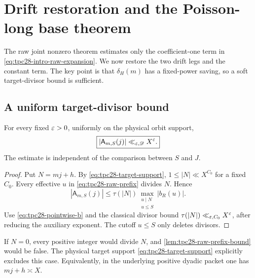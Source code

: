 \section{Drift restoration and the Poisson-long base theorem}
\label{sec:tpc28-drift-base}

The raw joint nonzero theorem estimates only the coefficient-one term
in \eqref{eq:tpc28-intro-raw-expansion}.  We now restore the two drift
legs and the constant term.  The key point is that $\delta_H(m)$ has
a fixed-power saving, so a soft target-divisor bound is sufficient.

\subsection{A uniform target-divisor bound}

\begin{lemma}
\label{lem:tpc28-raw-prefix-bound}
For every fixed $\varepsilon>0$, uniformly on the physical orbit support,
\begin{equation}
 \boxed{
 |\mathsf A_{m,S}(j)|\ll_{\varepsilon,\mathscr D}X^\varepsilon.}
 \label{eq:tpc28-raw-prefix-bound}
\end{equation}
The estimate is independent of the comparison between $S$ and $J$.
\end{lemma}

\begin{proof}
Put $N=mj+h$.  By \eqref{eq:tpc28-target-support},
$1\le|N|\ll X^{C_0}$ for a fixed $C_0$.  Every effective $u$ in
\eqref{eq:tpc28-raw-prefix} divides $N$.  Hence
\begin{equation}
 |\mathsf A_{m,S}(j)|
 \le\tau(|N|)
 \max_{\substack{u\mid N\\u\le S}}|b_R(u)|.
 \label{eq:tpc28-divisor-majorant}
\end{equation}
Use \eqref{eq:tpc28-pointwise-b} and the classical divisor bound
\(\tau(|N|)\ll_{\varepsilon,C_0}X^\varepsilon\), after reducing the auxiliary
exponent.  The cutoff $u\le S$ only deletes divisors.
\end{proof}

\begin{remark}
\label{rem:tpc28-nonzero-target}
If $N=0$, every positive integer would divide $N$, and
\cref{lem:tpc28-raw-prefix-bound} would be false.  The physical target
support \eqref{eq:tpc28-target-support} explicitly excludes this case.
Equivalently, in the underlying positive dyadic packet one has
$mj+h\asymp X$.
\end{remark}


